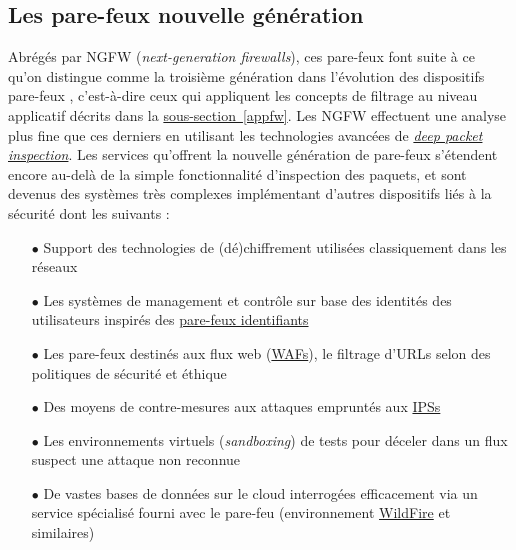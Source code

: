 \documentclass[]{article}
\begin{document}
\subsection{Les pare-feux nouvelle génération}

Abrégés par NGFW (\textit{next-generation firewalls}), ces pare-feux font suite à ce qu'on distingue comme la troisième génération dans l'évolution des dispositifs pare-feux \cite{wikifw}, c'est-à-dire ceux qui appliquent les concepts de filtrage au niveau applicatif décrits dans la \hyperref[appfw]{sous-section~\ref{appfw}}. Les NGFW effectuent une analyse plus fine que ces derniers en utilisant les technologies avancées de \href{https://en.wikipedia.org/wiki/Deep\_packet\_inspection}{\textit{deep packet inspection}}. Les services qu'offrent la nouvelle génération de pare-feux s'étendent encore au-delà de la simple fonctionnalité d'inspection des paquets, et sont devenus des systèmes très complexes implémentant d'autres dispositifs liés à la sécurité dont les suivants :
\vspace{0.2cm}
\begin{itemize}
\item[$\bullet$] Support des technologies de (dé)chiffrement utilisées classiquement dans les réseaux
\vspace{0.2cm}
\item[$\bullet$] Les systèmes de management et contrôle sur base des identités des utilisateurs inspirés des \hyperref[idfw]{pare-feux identifiants} 
\vspace{0.2cm}
\item[$\bullet$] Les pare-feux destinés aux flux web (\hyperref[waf]{WAFs}), le filtrage d'URLs selon des politiques de sécurité et éthique
\vspace{0.2cm}
\item[$\bullet$] Des moyens de contre-mesures aux attaques empruntés aux \hyperref[IPS]{IPSs}
\vspace{0.2cm}
\item[$\bullet$] Les environnements virtuels (\textit{sandboxing}) de tests pour déceler dans un flux suspect une attaque non reconnue \cite{Kokko2017}
\vspace{0.2cm}
\item[$\bullet$] De vastes bases de données sur le cloud interrogées efficacement via un service spécialisé fourni avec le pare-feu (environnement \href{https://www.paloaltonetworks.com/documentation/80/wildfire/wf\_admin/wildfire-overview/wildfire-deployments/wildfire-global-cloud}{WildFire} et similaires)
\end{itemize}
\end{document}
